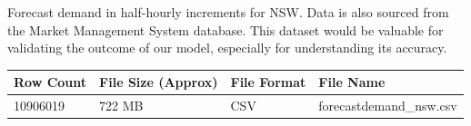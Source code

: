 \documentclass[mstat,12pt]{unswthesis}
\begin{document}
Forecast demand in half-hourly increments for NSW. Data is also sourced
from the Market Management System database. This dataset would be
valuable for validating the outcome of our model, especially for
understanding its accuracy.

\begin{table}[h]
\tiny
\begin{tabular}{@{}|l|l|l|l|@{}}
\toprule
\textbf{Row Count} & \textbf{File Size (Approx)} & \textbf{File Format} & \textbf{File Name}      \\ \midrule
10906019           & 722 MB                      & CSV                  & forecastdemand\_nsw.csv \\ \bottomrule
\end{tabular}
\end{table}
\end{document}
